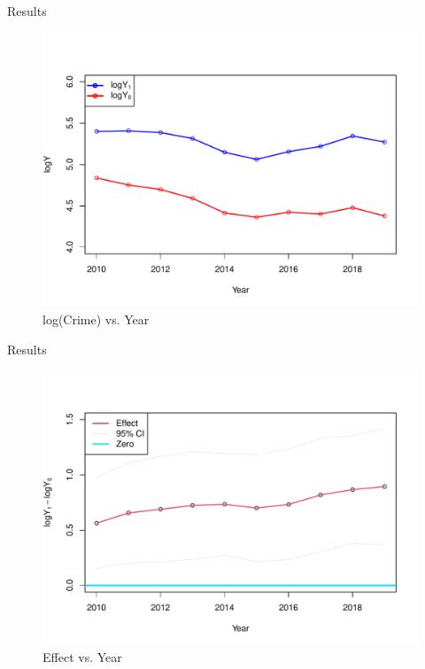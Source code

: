 \documentclass{beamer}
\begin{document}
\begin{frame}{Results}



\begin{figure}
    \centering
    \includegraphics[scale=0.4]{figures/lncrime-year1.pdf}
    \caption{log(Crime) vs. Year}
    \label{fig:lncrime-year}
\end{figure}



\end{frame}



\begin{frame}{Results}

\begin{figure}
    \centering
    \includegraphics[scale=0.4]{figures/ate-year1.pdf}
    \caption{Effect vs. Year}
    \label{fig:ate-year}
\end{figure}


\end{frame}
\end{document}
